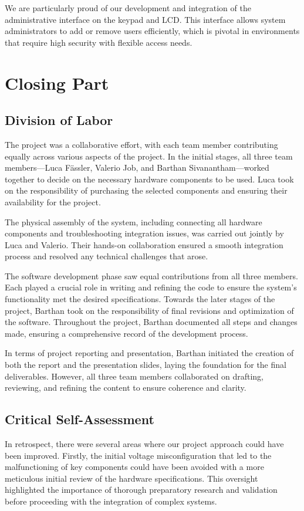 \documentclass{article}
\begin{document}
We are particularly proud of our development and integration of the administrative interface on the keypad and LCD. This interface allows system administrators to add or remove users efficiently, which is pivotal in environments that require high security with flexible access needs.

\section{Closing Part}

\subsection{Division of Labor}
The project was a collaborative effort, with each team member contributing equally across various aspects of the project. In the initial stages, all three team members—Luca Fässler, Valerio Job, and Barthan Sivanantham—worked together to decide on the necessary hardware components to be used. Luca took on the responsibility of purchasing the selected components and ensuring their availability for the project.

The physical assembly of the system, including connecting all hardware components and troubleshooting integration issues, was carried out jointly by Luca and Valerio. Their hands-on collaboration ensured a smooth integration process and resolved any technical challenges that arose.

The software development phase saw equal contributions from all three members. Each played a crucial role in writing and refining the code to ensure the system's functionality met the desired specifications. Towards the later stages of the project, Barthan took on the responsibility of final revisions and optimization of the software. Throughout the project, Barthan documented all steps and changes made, ensuring a comprehensive record of the development process.

In terms of project reporting and presentation, Barthan initiated the creation of both the report and the presentation slides, laying the foundation for the final deliverables. However, all three team members collaborated on drafting, reviewing, and refining the content to ensure coherence and clarity.

\subsection{Critical Self-Assessment}
In retrospect, there were several areas where our project approach could have been improved. Firstly, the initial voltage misconfiguration that led to the malfunctioning of key components could have been avoided with a more meticulous initial review of the hardware specifications. This oversight highlighted the importance of thorough preparatory research and validation before proceeding with the integration of complex systems.
\end{document}
